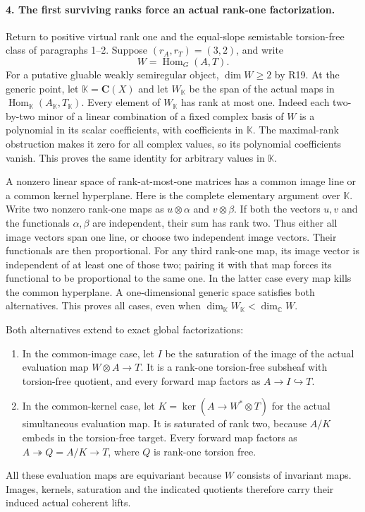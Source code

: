 \paragraph{4. The first surviving ranks force an actual rank-one factorization.}
Return to positive virtual rank one and the equal-slope
semistable torsion-free class of paragraphs 1--2.
Suppose $(r_A,r_T)=(3,2)$, and write
\[
                    W=\operatorname{Hom}_G(A,T).
 \tag{F1R21.11}
\]
For a putative gluable weakly semiregular object,
$\dim W\ge2$ by R19. At the generic point, let
$\mathbb K=\mathbf C(X)$ and let $W_{\mathbb K}$
be the span of the actual maps in
$\operatorname{Hom}_{\mathbb K}(A_{\mathbb K},T_{\mathbb K})$.
Every element of $W_{\mathbb K}$ has rank at most one.
Indeed each two-by-two minor of a linear combination
of a fixed complex basis of $W$ is a polynomial in
its scalar coefficients, with coefficients in
$\mathbb K$. The maximal-rank obstruction makes it
zero for all complex values, so its polynomial
coefficients vanish. This proves the same identity
for arbitrary values in $\mathbb K$.

A nonzero linear space of rank-at-most-one matrices
has a common image line or a common kernel hyperplane.
Here is the complete elementary argument over
$\mathbb K$. Write two nonzero rank-one maps as
$u\otimes\alpha$ and $v\otimes\beta$. If both the
vectors $u,v$ and the functionals $\alpha,\beta$ are
independent, their sum has rank two. Thus either all
image vectors span one line, or choose two independent
image vectors. Their functionals are then proportional.
For any third rank-one map, its image vector is
independent of at least one of those two; pairing it
with that map forces its functional to be proportional
to the same one. In the latter case every map kills
the common hyperplane. A one-dimensional generic
space satisfies both alternatives. This proves all
cases, even when $\dim_{\mathbb K}W_{\mathbb K}<\dim_{\mathbb C}W$.

Both alternatives extend to exact global factorizations:
\begin{enumerate}
\item In the common-image case, let $I$ be the saturation
of the image of the actual evaluation map
$W\otimes A\to T$. It is a rank-one torsion-free
subsheaf with torsion-free quotient, and every
forward map factors as $A\to I\hookrightarrow T$.
\item In the common-kernel case, let
$K=\ker(A\to W^*\otimes T)$ for the actual simultaneous
evaluation map. It is saturated of rank two, because
$A/K$ embeds in the torsion-free target. Every forward
map factors as $A\twoheadrightarrow Q=A/K\to T$,
where $Q$ is rank-one torsion free.
\end{enumerate}
All these evaluation maps are equivariant because
$W$ consists of invariant maps. Images, kernels,
saturation and the indicated quotients therefore
carry their induced actual coherent lifts.

